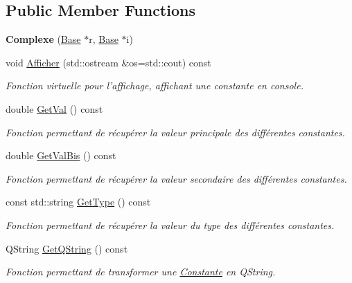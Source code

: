 \subsection*{Public Member Functions}
\begin{DoxyCompactItemize}
\item 
\hypertarget{class_complexe_afbc9334c87c0d03105c6b83cffa91ba6}{{\bfseries Complexe} (\hyperlink{class_base}{Base} $\ast$r, \hyperlink{class_base}{Base} $\ast$i)}\label{class_complexe_afbc9334c87c0d03105c6b83cffa91ba6}

\item 
void \hyperlink{class_complexe_ab81a9988e1a69cae64682e5030de5901}{Afficher} (std\-::ostream \&os=std\-::cout) const 
\begin{DoxyCompactList}\small\item\em Fonction virtuelle pour l'affichage, affichant une constante en console. \end{DoxyCompactList}\item 
double \hyperlink{class_complexe_ab3a3d0582d701ba9fa7ce45d7e82eb81}{Get\-Val} () const 
\begin{DoxyCompactList}\small\item\em Fonction permettant de récupérer la valeur principale des différentes constantes. \end{DoxyCompactList}\item 
double \hyperlink{class_complexe_acfe2a56e2024db9eca2039fccdb2d6f4}{Get\-Val\-Bis} () const 
\begin{DoxyCompactList}\small\item\em Fonction permettant de récupérer la valeur secondaire des différentes constantes. \end{DoxyCompactList}\item 
const std\-::string \hyperlink{class_complexe_aee55b37e0370e38f3aeedbbf25977876}{Get\-Type} () const 
\begin{DoxyCompactList}\small\item\em Fonction permettant de récupérer la valeur du type des différentes constantes. \end{DoxyCompactList}\item 
Q\-String \hyperlink{class_complexe_a32c9167b86fd9cfccb1295c2eecc516e}{Get\-Q\-String} () const 
\begin{DoxyCompactList}\small\item\em Fonction permettant de transformer une \hyperlink{class_constante}{Constante} en Q\-String. \end{DoxyCompactList}\item 

\end{DoxyCompactItemize}

